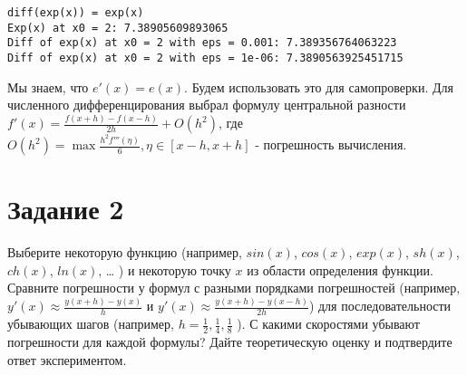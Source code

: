 \documentclass[11pt]{article}
\begin{document}
    \begin{Verbatim}[commandchars=\\\{\}]
diff(exp(x)) = exp(x)
Exp(x) at x0 = 2: 7.38905609893065
Diff of exp(x) at x0 = 2 with eps = 0.001: 7.389356764063223
Diff of exp(x) at x0 = 2 with eps = 1e-06: 7.3890563925451715
    \end{Verbatim}

    Мы знаем, что \(e'(x) = e(x)\). Будем использовать это для самопроверки.
Для численного дифференцирования выбрал формулу центральной разности
\(f'(x) = \frac{f(x+h) - f(x-h)}{2h} + O(h^{2})\), где
\(O(h^{2}) = \max{\frac{h^{2}f'''(\eta)}{6}}, \eta \in [x-h, x+h]\) -
погрешность вычисления.

    \hypertarget{ux437ux430ux434ux430ux43dux438ux435-2}{%
\section{Задание 2}\label{ux437ux430ux434ux430ux43dux438ux435-2}}

Выберите некоторую функцию (например, \(sin(x)\), \(cos(x)\),
\(exp(x)\), \(sh(x)\), \(ch(x)\), \(ln(x)\), \ldots{} ) и некоторую
точку \(x\) из области определения функции. Сравните погрешности у
формул с разными порядками погрешностей (например,
\(y'(x) \approx \frac{y(x+h)−y(x)}{h}\) и
\(y'(x) \approx \frac{y(x+h)−y(x-h)}{2h}\)) для последовательности
убывающих шагов (например, \(h = \frac{1}{2}, \frac{1}{4}, \frac{1}{8}\)
). С какими скоростями убывают погрешности для каждой формулы? Дайте
теоретическую оценку и подтвердите ответ экспериментом.
\end{document}
